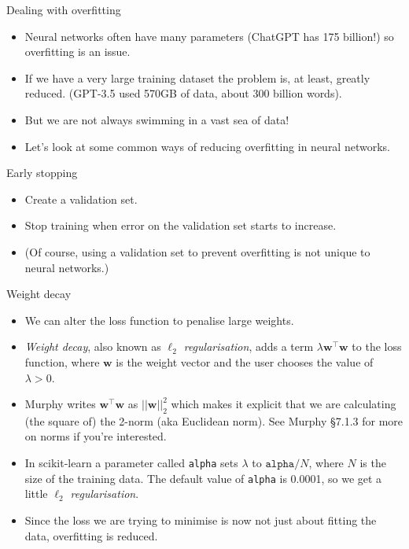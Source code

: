 \documentclass[10pt]{beamer}
\begin{document}
\begin{titledslide}{Dealing with overfitting}

  \begin{itemize}
  \item Neural networks often have many parameters (ChatGPT has 175
    billion!) so overfitting is an issue.
  \item If we have a very large training dataset the problem is, at
    least, greatly reduced. (GPT-3.5 used 570GB of data, about 300
    billion words).
  \item But we are not always swimming in a vast sea of data!
  \item Let's look at some common ways of reducing overfitting in
    neural networks.
  \end{itemize}
  
\end{titledslide}
\begin{titledslide}{Early stopping}

  \begin{itemize}
  \item Create a validation set.
  \item Stop training when error on the validation set starts to
    increase.
  \item (Of course, using a validation set to prevent overfitting is
    not unique to neural networks.)
  \end{itemize}
  
\end{titledslide}
\begin{titledslide}{Weight decay}

  \begin{itemize}
  \item We can alter the loss function to penalise large weights.
  \item \emph{Weight decay}, also known as \emph{$\ell_2$
      regularisation}, adds a term $\lambda
    \mathbf{w}^{\top}\mathbf{w}$ to the loss function, where
    $\mathbf{w}$ is the weight vector and the user
    chooses the value of $\lambda > 0$.
  \item Murphy writes $\mathbf{w}^{\top}\mathbf{w}$ as
    $||\mathbf{w}||_{2}^{2}$ which makes it explicit that we are
    calculating (the square of) the 2-norm (aka Euclidean norm). See
    Murphy \S7.1.3 for more on norms if you're interested.
  \item In scikit-learn a parameter called \texttt{alpha} sets
    $\lambda$ to $\mathtt{alpha}/N$, where $N$ is the size of the
    training data. The default value of
    \texttt{alpha} is 0.0001, so we get a little \emph{$\ell_2$
      regularisation}.
  \item Since the loss we are trying to minimise is now not just about
    fitting the data, overfitting is reduced.
  \end{itemize}
  
\end{titledslide}
\end{document}
